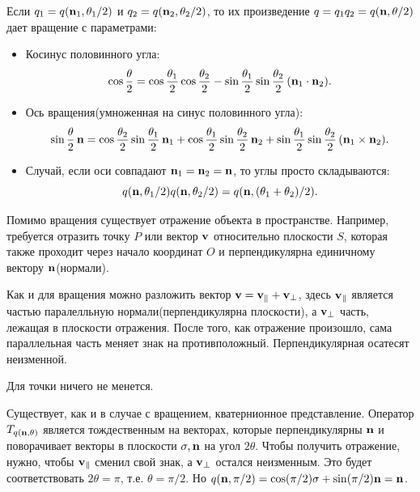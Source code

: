 Если $q_1 = q(\vb{n}_1, \theta_1/2)$ и $q_2 = q(\vb{n}_2, \theta_2/2)$, то их произведение $q = q_1 q_2 = q(\vb{n}, \theta/2)$ дает вращение с параметрами:
\begin{itemize}
    \item Косинус половинного угла:
        \begin{equation*}
            \cos\frac{\theta}{2} = \cos\frac{\theta_1}{2}\cos\frac{\theta_2}{2} - \sin\frac{\theta_1}{2}\sin\frac{\theta_2}{2}\,(\vb{n}_1\cdot\vb{n}_2).
        \end{equation*}
    \item Ось вращения(умноженная на синус половинного угла):
        \begin{equation*}
            \sin\frac{\theta}{2}\,\vb{n} = \cos\frac{\theta_2}{2}\sin\frac{\theta_1}{2}\,\vb{n}_1 + \cos\frac{\theta_1}{2}\sin\frac{\theta_2}{2}\,\vb{n}_2 + \sin\frac{\theta_1}{2}\sin\frac{\theta_2}{2}\,(\vb{n}_1\times\vb{n}_2).
        \end{equation*}
    \item Случай, если оси совпадают $\vb{n}_1 = \vb{n}_2 = \vb{n}$, то углы просто складываются:
        \begin{equation*}
            q(\vb{n}, \theta_1/2) q(\vb{n}, \theta_2/2) = q(\vb{n}, (\theta_1+\theta_2)/2).
        \end{equation*}
\end{itemize}

Помимо вращения существует отражение объекта в пространстве. Например, требуется отразить точку $P$ или вектор $\vb{v}$ относительно плоскости $S$, которая также проходит через начало координат $O$ и перпендикулярна единичному вектору $\vb{n}$(нормали).

Как и для вращения можно разложить вектор $\vb{v} = \vb{v}_{\parallel} + \vb{v}_{\perp}$, здесь $\vb{v}_{\parallel}$ является частью паралелльную нормали(перпендикулярна плоскости), а $\vb{v}_{\perp}$ часть, лежащая в плоскости отражения.
После того, как отражение произошло, сама параллельная часть меняет знак на противположный. Перпендикулярная осатесят неизменной.

Для точки ничего не менется.

Существует, как и в случае с вращением, кватернионное представление. Оператор $T_{q(\vb{n},\theta)}$ является тождественным на векторах, которые перпендикулярны $\vb{n}$ и поворачивает векторы в плоскости $\sigma, \vb{n}$ на угол $2\theta$. Чтобы получить отражение, нужно, чтобы $\vb{v}_{\parallel}$ сменил свой знак, а $\vb{v}_{\perp}$ остался неизменным. Это будет соответствовать $2\theta = \pi$, т.е. $\theta = \pi/2$. Но $q(\vb{n}, \pi/2) = \cos(\pi/2)\sigma + \sin(\pi/2)\vb{n} = \vb{n}$.

